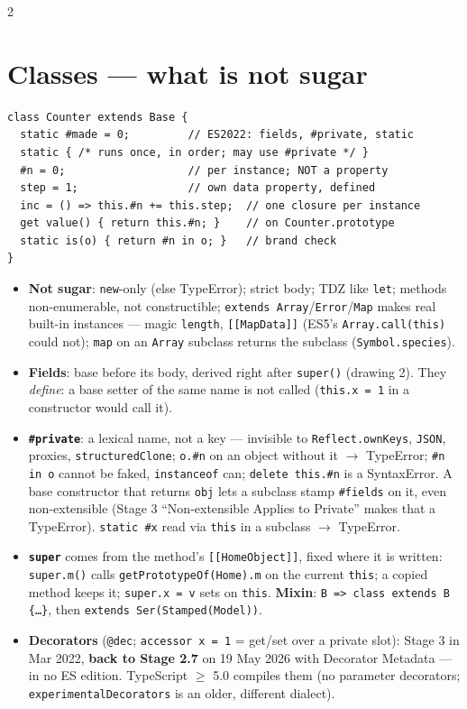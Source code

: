 \documentclass[8pt]{extarticle}
\newcommand\ct[1]{\texttt{#1}}
\newcommand\fat{\hbox{=}\hbox{>}}%
\begin{document}
\begin{multicols}{2}
\section{Classes — what is not sugar}
\begin{lstlisting}[style=js]
class Counter extends Base {
  static #made = 0;         // ES2022: fields, #private, static
  static { /* runs once, in order; may use #private */ }
  #n = 0;                   // per instance; NOT a property
  step = 1;                 // own data property, defined
  inc = () => this.#n += this.step;  // one closure per instance
  get value() { return this.#n; }    // on Counter.prototype
  static is(o) { return #n in o; }   // brand check
}
\end{lstlisting}
\begin{itemize}\raggedright
  \item \textbf{Not sugar}: \ct{new}-only (else TypeError); strict body; TDZ like \ct{let};
        methods non-enumerable, not constructible; \ct{extends Array}/\ct{Error}/\ct{Map}
        makes real built-in instances — magic \ct{length}, \ct{[[MapData]]} (ES5's
        \ct{Array.call(this)} could not); \ct{map} on an \ct{Array} subclass returns the
        subclass (\ct{Symbol.species}).
  \item \textbf{Fields}: base before its body, derived right after \ct{super()} (drawing 2).
        They \emph{define}: a base setter of the same name is not called (\ct{this.x = 1} in a
        constructor would call it).
  \item \textbf{\ct{\#private}}: a lexical name, not a key — invisible to \ct{Reflect.ownKeys},
        \ct{JSON}, proxies, \ct{structuredClone}; \ct{o.\#n} on an object without it $\to$
        TypeError; \ct{\#n in o} cannot be faked, \ct{instanceof} can; \ct{delete this.\#n}
        is a SyntaxError. A base constructor that returns \ct{obj} lets a subclass stamp
        \ct{\#fields} on it, even non-extensible (Stage 3 ``Non-extensible Applies to
        Private'' makes that a TypeError). \ct{static \#x} read via \ct{this} in a subclass
        $\to$ TypeError.
  \item \textbf{\ct{super}} comes from the method's \ct{[[HomeObject]]}, fixed where it is
        written: \ct{super.m()} calls \ct{getPrototypeOf(Home).m} on the current \ct{this}; a
        copied method keeps it; \ct{super.x = v} sets on \ct{this}. \textbf{Mixin}:
        \ct{B \fat{} class extends B \{\ldots\}}, then \ct{extends Ser(Stamped(Model))}.
  \item \textbf{Decorators} (\ct{@dec}; \ct{accessor x = 1} = get/set over a private slot):
        Stage 3 in Mar 2022, \textbf{back to Stage 2.7} on 19 May 2026 with Decorator Metadata
        — in no ES edition. TypeScript $\ge$ 5.0 compiles them (no parameter decorators;
        \ct{experimentalDecorators} is an older, different dialect).
\end{itemize}


\end{multicols}
\end{document}
